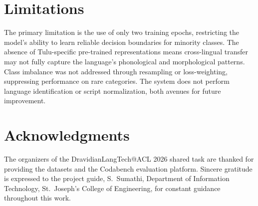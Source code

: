 \documentclass[11pt]{article}
\begin{document}
\vspace{-2pt}
\section*{Limitations}

The primary limitation is the use of only two training epochs, restricting the model's ability to learn
reliable decision boundaries for minority classes.
The absence of Tulu-specific pre-trained representations means cross-lingual transfer may not
fully capture the language's phonological and morphological patterns. Class imbalance was not addressed through resampling or loss-weighting, suppressing performance on rare categories. The system does not perform language identification or
script normalization, both avenues for future improvement.

\vspace{-2pt}
\section*{Acknowledgments}

The organizers of the DravidianLangTech@ACL 2026 shared task are thanked
for providing the datasets and the Codabench
evaluation platform. Sincere gratitude is expressed
to the project guide, S.~Sumathi, Department of
Information Technology, St.~Joseph's College of
Engineering, for constant guidance throughout this
work.

\setlength{\bibsep}{0pt}
\footnotesize

\end{document}
